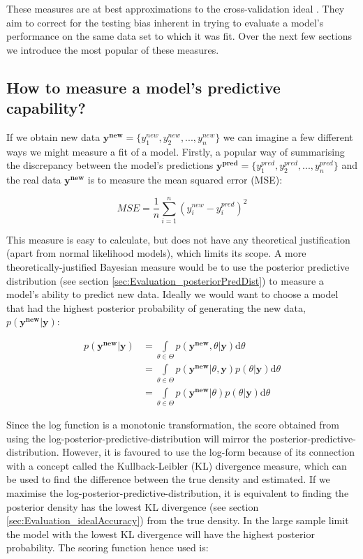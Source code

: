 \documentclass[11pt,fullpage]{book}
\begin{document}
These measures are at best approximations to the cross-validation ideal \cite{gelman2014understanding}. They aim to correct for the testing bias inherent in trying to evaluate a model's performance on the same data set to which it was fit. Over the next few sections we introduce the most popular of these measures. 

\subsection{How to measure a model's predictive capability?}
If we obtain new data $\boldsymbol{y^{new}}=\{y^{new}_1,y^{new}_2,...,y^{new}_n\}$ we can imagine a few different ways we might measure a fit of a model. Firstly, a popular way of summarising the discrepancy between the model's predictions $\boldsymbol{y^{pred}}=\{y^{pred}_1,y^{pred}_2,...,y^{pred}_n\}$ and the real data $\boldsymbol{y^{new}}$ is to measure the mean squared error (MSE):

\begin{equation}
MSE = \frac{1}{n}\sum\limits_{i=1}^{n} (y^{new}_i-y^{pred}_i)^2
\end{equation}

This measure is easy to calculate, but does not have any theoretical justification (apart from normal likelihood models), which limits its scope. A more theoretically-justified Bayesian measure would be to use the posterior predictive distribution (see section \ref{sec:Evaluation_posteriorPredDist}) to measure a model's ability to predict new data. Ideally we would want to choose a model that had the highest posterior probability of generating the new data, $p(\boldsymbol{y^{new}}|\boldsymbol{y})$:

\begin{equation}\label{eq:Evaluation_posteriorPredictiveDist}
\begin{align}
p(\boldsymbol{y^{new}}|\boldsymbol{y}) &= \int\limits_{\theta\in\Theta} p(\boldsymbol{y^{new}},\theta|\boldsymbol{y})\mathrm{d}\theta\\
&= \int\limits_{\theta\in\Theta} p(\boldsymbol{y^{new}}|\theta,\boldsymbol{y})p(\theta|\boldsymbol{y})\mathrm{d}\theta\\
&= \int\limits_{\theta\in\Theta} p(\boldsymbol{y^{new}}|\theta)p(\theta|\boldsymbol{y})\mathrm{d}\theta
\end{align}
\end{equation} 


Since the log function is a monotonic transformation, the score obtained from using the log-posterior-predictive-distribution will mirror the posterior-predictive-distribution. However, it is favoured to use the log-form because of its connection with a concept called the Kullback-Leibler (KL) divergence measure, which can be used to find the difference between the true density and estimated. If we maximise the log-posterior-predictive-distribution, it is equivalent to finding the posterior density has the lowest KL divergence (see section \ref{sec:Evaluation_idealAccuracy}) from the true density. In the large sample limit the model with the lowest KL divergence will have the highest posterior probability. The scoring function hence used is: 
\end{document}
